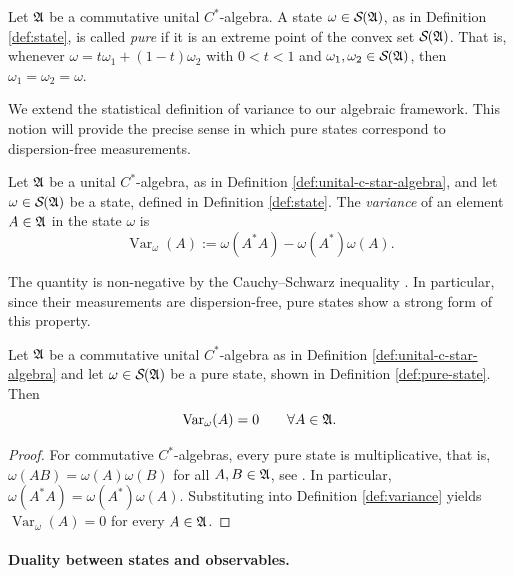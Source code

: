 	\begin{definition}\label{def:pure-state}
		Let $\mathfrak{A}$ be a commutative unital $C^*$-algebra. A state $\omega\in\mathcal{S}(\A)$, as in Definition \ref{def:state}, is called \emph{pure} if it is an extreme point of the convex set $\mathcal{S}(\A)$. That is, whenever $\omega = t\omega_1+(1-t)\omega_2$ with $0<t<1$ and $\omega_1,\omega_2\in\mathcal{S}(\A)$, then $\omega_1=\omega_2=\omega$.
	\end{definition}
	
	\noindent We extend the statistical definition of variance to our algebraic framework. This notion will provide the precise sense in which pure states correspond to dispersion-free measurements.
	
	\begin{definition}\label{def:variance}
		Let $\mathfrak{A}$ be a unital $C^*$-algebra, as in Definition \ref{def:unital-c-star-algebra}, and let $\omega \in \mathcal{S}(\A)$ be a state, defined in Definition \ref{def:state}. The \emph{variance} of an element $A \in \mathfrak{A}$ in the state $\omega$ is
		\[
		\operatorname{Var}_\omega(A) := \omega(A^* A) - \omega(A^*) \omega(A).
		\]
	\end{definition}
	
	The quantity is non-negative by the Cauchy--Schwarz inequality \cite[Lemma 2.3.10]{bratteliOperatorAlgebrasQuantum}. In particular, since their measurements are dispersion-free, pure states show a strong form of this property.
	
	\begin{proposition}\label{prop:pure-zero-var}
		Let $\mathfrak{A}$ be a commutative unital $C^*$-algebra as in Definition \ref{def:unital-c-star-algebra} and let $\omega \in \mathcal{S}(\A)$ be a pure state, shown in Definition \ref{def:pure-state}. Then
		\[
		\operatorname{Var}_\omega(A) = 0 \qquad \forall A \in \mathfrak{A}.
		\]
	\end{proposition}
	\begin{proof}
		For commutative $C^*$-algebras, every pure state is multiplicative, that is, $\omega(AB)=\omega(A)\omega(B)$ for all $A,B\in\mathfrak{A}$, see \cite[Proposition 2.3.27]{bratteliOperatorAlgebrasQuantum}. In particular, $\omega(A^*A)=\omega(A^*)\omega(A)$. Substituting into Definition \ref{def:variance} yields $\operatorname{Var}_\omega(A)=0$ for every $A\in\mathfrak{A}$.
	\end{proof}
	
	\medskip
	\paragraph{Duality between states and observables.}
	

